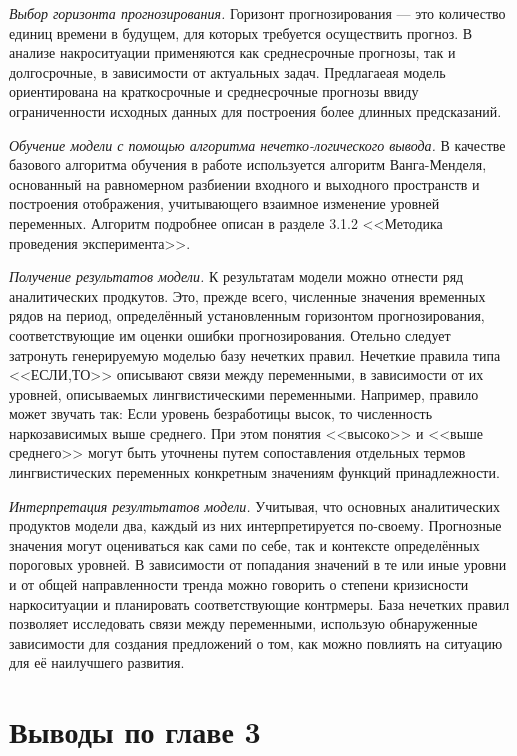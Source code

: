 \textit{Выбор горизонта прогнозирования.} Горизонт прогнозирования --- это
количество единиц времени в будущем, для которых требуется осуществить прогноз.
В анализе накроситуации применяются как среднесрочные прогнозы, так и
долгосрочные, в зависимости от актуальных задач.  Предлагаеая модель
ориентирована на краткосрочные и среднесрочные прогнозы ввиду ограниченности
исходных данных для построения более длинных предсказаний.

\textit{Обучение модели с помощью алгоритма нечетко-логического вывода.}
В качестве базового алгоритма обучения в работе используется  алгоритм
Ванга-Менделя, основанный на равномерном разбиении входного и выходного
пространств и построения отображения, учитывающего взаимное изменение уровней
переменных. Алгоритм подробнее описан в разделе 3.1.2 <<Методика проведения
эксперимента>>.

\textit{Получение результатов модели.} К результатам модели можно отнести ряд
аналитических продкутов. Это, прежде всего, численные значения временных рядов
на период, определённый установленным горизонтом прогнозирования,
соответствующие им оценки ошибки прогнозирования. Отельно следует затронуть
генерируемую моделью базу нечетких правил. Нечеткие правила типа <<ЕСЛИ,ТО>>
описывают связи между переменными, в зависимости от их уровней, описываемых
лингвистическими переменными. Например, правило может звучать так: Если уровень
безработицы высок, то численность наркозависимых выше среднего. При этом понятия
<<высоко>> и <<выше среднего>> могут быть уточнены путем сопоставления отдельных
термов лингвистических переменных конкретным значениям функций принадлежности.

\textit{Интерпретация резултьтатов модели.} Учитывая, что основных аналитических
продуктов модели два, каждый из них интерпретируется по-своему. Прогнозные
значения могут оцениваться как сами по себе, так и контексте определённых
пороговых уровней. В зависимости от попадания значений в те или иные уровни и от
общей направленности тренда можно говорить о степени кризисности наркоситуации и
планировать соответствующие контрмеры. База нечетких правил позволяет
исследовать связи между переменными, использую обнаруженные зависимости для
создания предложений о том, как можно повлиять на ситуацию для её наилучшего
развития.

\section*{Выводы по главе 3}

